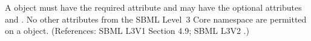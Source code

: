 A \RateRule object must have the required attribute  and
may have the optional attributes   and .  No
other attributes from the SBML Level~3 Core namespace are permitted on a
\RateRule object.  (References: SBML L3V1 Section 4.9; SBML L3V2 .)
